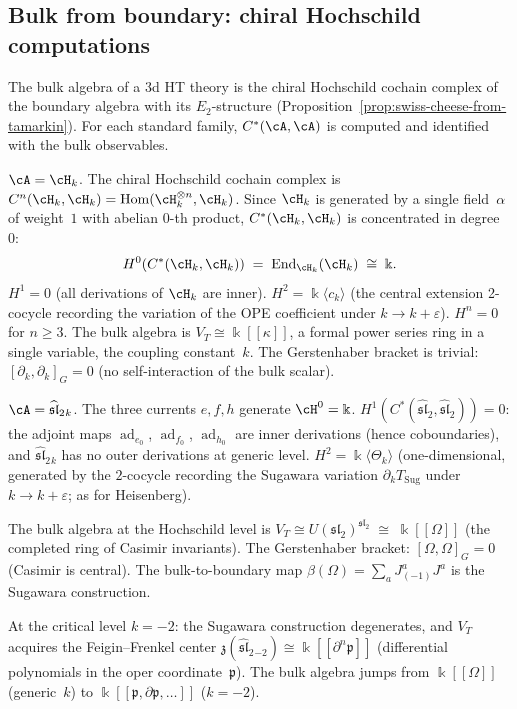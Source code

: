 \subsection{Bulk from boundary: chiral Hochschild computations}
\label{subsec:bulk-from-boundary}

The bulk algebra of a 3d HT theory is the chiral Hochschild cochain
complex of the boundary algebra with its $E_2$-structure
(Proposition~\ref{prop:swiss-cheese-from-tamarkin}).
For each standard family, $C^*(\cA,\cA)$ is computed and identified with the bulk observables.

\begin{computation}
\label{comp:bulk-heisenberg}
$\cA=\cH_k$. The chiral Hochschild cochain complex is
$C^n(\cH_k,\cH_k)
=\operatorname{Hom}(\cH_k^{\otimes n},\cH_k)$.
Since $\cH_k$ is generated by a single field~$\alpha$ of
weight~$1$ with abelian $0$-th product, $C^*(\cH_k,\cH_k)$
is concentrated in degree~$0$:
\[
H^0(C^*(\cH_k,\cH_k))
\;=\;
\operatorname{End}_{\cH_k}(\cH_k)
\;\cong\;
\Bbbk.
\]
$H^1=0$ (all derivations of $\cH_k$ are inner).
$H^2=\Bbbk\langle c_k\rangle$
(the central extension 2-cocycle recording the variation
of the OPE coefficient under $k\to k+\varepsilon$).
$H^n=0$ for $n\ge 3$. The bulk algebra is
$V_T\cong\Bbbk[[\kappa]]$, a formal power series ring
in a single variable, the coupling constant~$k$.
The Gerstenhaber bracket is trivial:
$[\partial_k,\partial_k]_G=0$
(no self-interaction of the bulk scalar).
\end{computation}

\begin{computation}
\label{comp:bulk-sl2}
$\cA=\widehat{\mathfrak{sl}}_2{}_k$. The three currents
$e,f,h$ generate $\cH^0=\Bbbk$.
$H^1(C^*(\widehat{\mathfrak{sl}}_2,
\widehat{\mathfrak{sl}}_2))=0$: the adjoint maps
$\operatorname{ad}_{e_0}$,
$\operatorname{ad}_{f_0}$, $\operatorname{ad}_{h_0}$
are inner derivations (hence coboundaries),
and $\widehat{\mathfrak{sl}}_2{}_k$ has no outer
derivations at generic level.
$H^2=\Bbbk\langle\Theta_k\rangle$
(one-dimensional, generated by the $2$-cocycle recording
the Sugawara variation $\partial_k T_{\mathrm{Sug}}$
under $k\to k+\varepsilon$; as for Heisenberg).

The bulk algebra at the Hochschild level is
$V_T\cong U(\mathfrak{sl}_2)^{\mathfrak{sl}_2}
\;\cong\;\Bbbk[[\Omega]]$
(the completed ring of Casimir invariants).
The Gerstenhaber bracket:
$[\Omega,\Omega]_G=0$ (Casimir is central).
The bulk-to-boundary map $\beta(\Omega)
=\sum_a J^a_{(-1)}J^a$ is the Sugawara
construction.

At the critical level $k=-2$: the Sugawara construction
degenerates, and $V_T$ acquires the Feigin--Frenkel center
$\mathfrak z(\widehat{\mathfrak{sl}}_2{}_{-2})
\cong\Bbbk[[\partial^n\mathfrak p]]$
(differential polynomials in the oper coordinate~$\mathfrak p$).
The bulk algebra jumps from $\Bbbk[[\Omega]]$ (generic~$k$)
to $\Bbbk[[\mathfrak p,\partial\mathfrak p,\dots]]$ ($k=-2$).
\end{computation}

